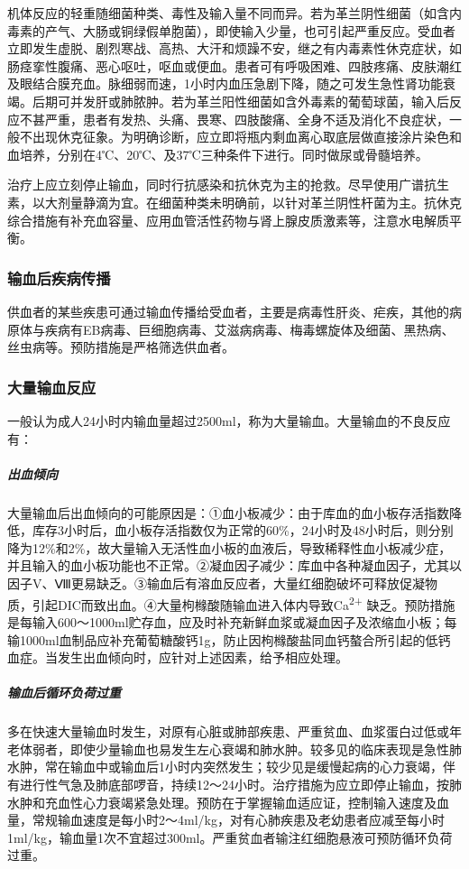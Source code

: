 机体反应的轻重随细菌种类、毒性及输入量不同而异。若为革兰阴性细菌（如含内毒素的产气、大肠或铜绿假单胞菌），即使输入少量，也可引起严重反应。受血者立即发生虚脱、剧烈寒战、高热、大汗和烦躁不安，继之有内毒素性休克症状，如肠痉挛性腹痛、恶心呕吐，呕血或便血。患者可有呼吸困难、四肢疼痛、皮肤潮红及眼结合膜充血。脉细弱而速，1小时内血压急剧下降，随之可发生急性肾功能衰竭。后期可并发肝或肺脓肿。若为革兰阳性细菌如含外毒素的葡萄球菌，输入后反应不甚严重，患者有发热、头痛、畏寒、四肢酸痛、全身不适及消化不良症状，一般不出现休克征象。为明确诊断，应立即将瓶内剩血离心取底层做直接涂片染色和血培养，分别在4℃、20℃、及37℃三种条件下进行。同时做尿或骨髓培养。

治疗上应立刻停止输血，同时行抗感染和抗休克为主的抢救。尽早使用广谱抗生素，以大剂量静滴为宜。在细菌种类未明确前，以针对革兰阴性杆菌为主。抗休克综合措施有补充血容量、应用血管活性药物与肾上腺皮质激素等，注意水电解质平衡。

\subsubsection{输血后疾病传播}

供血者的某些疾患可通过输血传播给受血者，主要是病毒性肝炎、疟疾，其他的病原体与疾病有EB病毒、巨细胞病毒、艾滋病病毒、梅毒螺旋体及细菌、黑热病、丝虫病等。预防措施是严格筛选供血者。

\subsubsection{大量输血反应}

一般认为成人24小时内输血量超过2500ml，称为大量输血。大量输血的不良反应有：

\subparagraph{出血倾向}

大量输血后出血倾向的可能原因是：①血小板减少：由于库血的血小板存活指数降低，库存3小时后，血小板存活指数仅为正常的60\%，24小时及48小时后，则分别降为12\%和2\%，故大量输入无活性血小板的血液后，导致稀释性血小板减少症，并且输入的血小板功能也不正常。②凝血因子减少：库血中各种凝血因子，尤其以因子V、Ⅷ更易缺乏。③输血后有溶血反应者，大量红细胞破坏可释放促凝物质，引起DIC而致出血。④大量枸橼酸随输血进入体内导致Ca\textsuperscript{2+}
缺乏。预防措施是每输入600～1000ml贮存血，应及时补充新鲜血浆或凝血因子及浓缩血小板；每输1000ml血制品应补充葡萄糖酸钙1g，防止因枸橼酸盐同血钙螯合所引起的低钙血症。当发生出血倾向时，应针对上述因素，给予相应处理。

\subparagraph{输血后循环负荷过重}

多在快速大量输血时发生，对原有心脏或肺部疾患、严重贫血、血浆蛋白过低或年老体弱者，即使少量输血也易发生左心衰竭和肺水肿。较多见的临床表现是急性肺水肿，常在输血中或输血后1小时内突然发生；较少见是缓慢起病的心力衰竭，伴有进行性气急及肺底部啰音，持续12～24小时。治疗措施为应立即停止输血，按肺水肿和充血性心力衰竭紧急处理。预防在于掌握输血适应证，控制输入速度及血量，常规输血速度是每小时2～4ml/kg，对有心肺疾患及老幼患者应减至每小时1ml/kg，输血量1次不宜超过300ml。严重贫血者输注红细胞悬液可预防循环负荷过重。

